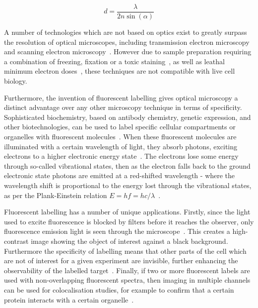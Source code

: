 \begin{equation} \label{eq:abbe}
d = \frac{\lambda}{2n\sin\left (\alpha  \right )}\end{equation}

A number of technologies which are not based on optics exist to greatly surpass the resolution of optical microscopes, including transmission electron microscopy and scanning electron microscopy~\cite{reinhold1931configuration, wells2006early, reimer2013transmission}.
However due to sample preparation requiring a combination of freezing, fixation or a toxic staining~\cite{kuo2007electron}, as well as leathal minimum electron doses~\cite{de2016live}, these techniques are not compatible with live cell biology.

Furthermore, the invention of fluorescent labelling gives optical microscopy a distinct advantage over any other microscopy technique in terms of specificity. 
Sophisticated biochemistry, based on antibody chemistry, genetic expression, and other biotechnologies, can be used to label specific cellular compartments or organelles with fluorescent molecules~\cite{day2014fluorescent}. 
When these fluorescent molecules are illuminated with a certain wavelength of light, they absorb photons, exciting electrons to a higher electronic energy state~\cite[\textit{ch. 1}]{lakowicz2007principles}. 
The electrons lose some energy through so-called vibrational states, then as the electron falls back to the ground electronic state photons are emitted at a red-shifted wavelength - where the wavelength shift is proportional to the energy lost through the vibrational states, as per the Plank-Einstein relation $E=hf=hc/\lambda$~\cite[\textit{ch. 39}]{halliday2010principles}. 

Fluorescent labelling has a number of unique applications. 
Firstly, since the light used to excite fluorescence is blocked by filters before it reaches the observer, only fluorescence emission light is seen through the microscope~\cite{ploem1967use}. 
This creates a high-contrast image showing the object of interest against a black background. 
Furthermore the specificity of labelling means that other parts of the cell which are not of interest for a given experiment are invisible, further enhancing the observability of the labelled target~\cite{day2014fluorescent}.
Finally, if two or more fluorescent labels are used with non-overlapping fluorescent spectra, then imaging in multiple channels can be used for colocalisation studies, for example to confirm that a certain protein interacts with a certain organelle~\cite{dunn2011practical}. 


